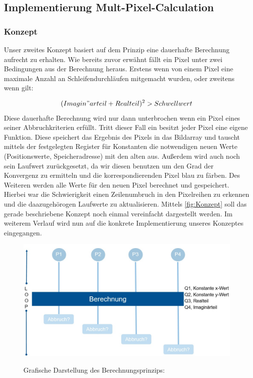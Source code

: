 \documentclass[11pt]{scrartcl}
\begin{document}
\subsection{Implementierung Mult-Pixel-Calculation}


\subsubsection{Konzept}

Unser zweites Konzept basiert auf dem Prinzip eine dauerhafte Berechnung aufrecht zu erhalten.
Wie bereits zuvor erwähnt fällt ein Pixel unter zwei Bedingungen aus der Berechnung heraus. Erstens wenn von einem Pixel eine maximale Anzahl an Schleifendurchläufen mitgemacht wurden, oder zweitens wenn gilt:

\begin{equation*}
      (Imagin"arteil + Realteil)^2 > Schwellwert
\end{equation*}
Diese dauerhafte Berechnung wird nur dann unterbrochen wenn ein Pixel eines seiner Abbruchkriterien erfüllt.
Tritt dieser Fall ein besitzt jeder Pixel eine eigene Funktion. Diese speichert das Ergebnis des Pixels in das Bildarray und tauscht
mittels der festgelegten Register für Konstanten die notwendigen neuen Werte (Positionswerte, Speicheradresse) mit den alten aus. Außerdem wird auch noch sein Laufwert zurückgesetzt, da wir diesen benutzen um den Grad der Konvergenz zu ermitteln und die korrespondierenden Pixel blau zu färben.
Des Weiteren werden alle Werte für den neuen Pixel berechnet und gespeichert.
Hierbei war die Schwierigkeit einen Zeilenumbruch in den Pixelreihen zu erkennen und die daazugehörogen Laufwerte zu aktualisieren.
Mittels \autoref{fig:Konzept} soll das gerade beschriebene Konzept noch einmal vereinfacht dargestellt werden.
Im weiterem Verlauf wird nun auf die konkrete Implementierung unseres Konzeptes eingegangen.


\begin{figure}[ht]
  \begin{center}
    \includegraphics[width=12cm]{pictures/KonzeptLanes}
    \caption{Grafische Darstellung des Berechnungsprinzips:}

    \label{fig:Konzept}
  \end{center}
\end{figure}
\end{document}
